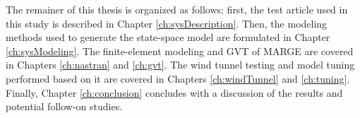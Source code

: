 The remainer of this thesis is organized as follows: first, the test article used in this study is described in Chapter \ref{ch:sysDescription}. Then, the modeling methods used to generate the state-space model are formulated in Chapter \ref{ch:sysModeling}. The finite-element modeling and GVT of MARGE are covered in Chapters \ref{ch:nastran} and \ref{ch:gvt}. The wind tunnel testing and model tuning performed based on it are covered in Chapters \ref{ch:windTunnel} and \ref{ch:tuning}. Finally, Chapter \ref{ch:conclusion} concludes with a discussion of the results and potential follow-on studies.